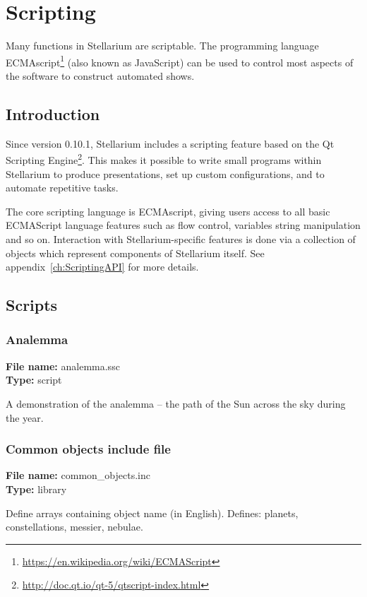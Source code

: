 
\chapter{Scripting}
\label{ch:scripting}

Many functions in Stellarium are scriptable. The programming language
ECMAscript\footnote{\url{https://en.wikipedia.org/wiki/ECMAScript}} (also known as JavaScript) can be used to control most
aspects of the software to construct automated shows.

\section{Introduction}
\label{sec:scripting:introduction}

Since version 0.10.1, Stellarium includes a scripting feature based on the Qt Scripting Engine\footnote{\url{http://doc.qt.io/qt-5/qtscript-index.html}}. This makes it possible to write small programs within Stellarium to produce presentations, set up custom configurations, and to automate repetitive tasks. 

The core scripting language is ECMAscript, giving users access to all basic ECMAScript language features such as flow control, variables string manipulation and so on. Interaction with Stellarium-specific features is done via a collection of objects which represent components of Stellarium itself. See appendix~\ref{ch:ScriptingAPI} for more details.

\section{Scripts}
\label{sec:scripting:scripts}

\subsection{Analemma}
\textbf{File name:} analemma.ssc \\
\textbf{Type:} script

A demonstration of the analemma -- the path of the Sun across the sky during the year.

\subsection{Common objects include file}
\textbf{File name:} common\_objects.inc \\
\textbf{Type:} library

Define arrays containing object name (in English). Defines: planets, constellations, messier, nebulae.

